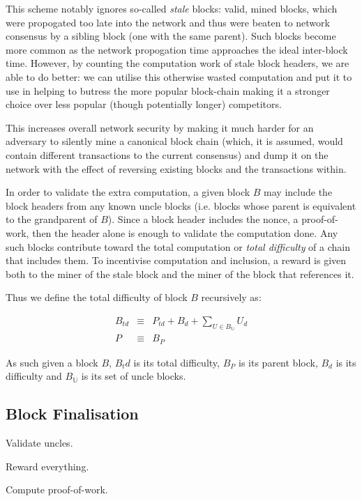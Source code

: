 \documentclass[9pt,oneside]{amsart}
\begin{document}
\begin{multicols}{2}
This scheme notably ignores so-called \textit{stale} blocks: valid, mined blocks, which were propogated too late into the network and thus were beaten to network consensus by a sibling block (one with the same parent). Such blocks become more common as the network propogation time approaches the ideal inter-block time. However, by counting the computation work of stale block headers, we are able to do better: we can utilise this otherwise wasted computation and put it to use in helping to butress the more popular block-chain making it a stronger choice over less popular (though potentially longer) competitors.

This increases overall network security by making it much harder for an adversary to silently mine a canonical block chain (which, it is assumed, would contain different transactions to the current consensus) and dump it on the network with the effect of reversing existing blocks and the transactions within.

In order to validate the extra computation, a given block $B$ may include the block headers from any known uncle blocks (i.e. blocks whose parent is equivalent to the grandparent of $B$). Since a block header includes the nonce, a proof-of-work, then the header alone is enough to validate the computation done. Any such blocks contribute toward the total computation or \textit{total difficulty} of a chain that includes them. To incentivise computation and inclusion, a reward is given both to the miner of the stale block and the miner of the block that references it.

Thus we define the total difficulty of block $B$ recursively as:

\begin{eqnarray}
B_{td} & \equiv & P_{td} + B_d + \sum\limits_{U \in B_\mathbb{U}} U_d \\
P & \equiv & B_P
\end{eqnarray}

As such given a block $B$, $B_td$ is its total difficulty, $B_P$ is its parent block, $B_d$ is its difficulty and $B_\mathbb{U}$ is its set of uncle blocks.

\subsection{Block Finalisation} \label{ch:finalisation}

Validate uncles.

Reward everything.

Compute proof-of-work.


\end{multicols}
\end{document}
